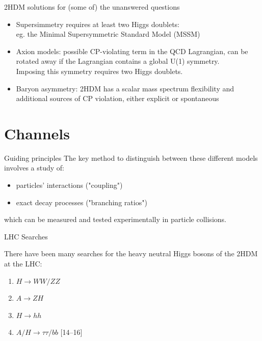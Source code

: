 \documentclass[10pt]{beamer} %
\begin{document}
\begin{frame}{2HDM solutions for (some of) the unanswered questions}
    \begin{itemize}
        \item Supersimmetry requires at least two Higgs doublets:\\
        eg. the Minimal Supersymmetric Standard Model (MSSM)
        \item Axion models: possible CP-violating term in the QCD Lagrangian, can be rotated away if the Lagrangian contains a global U(1) symmetry. \\
        Imposing this symmetry requires two Higgs doublets.
        \item Baryon asymmetry:  2HDM has a scalar mass spectrum flexibility and additional sources of CP violation, either explicit or spontaneous
    \end{itemize}
    
\end{frame}


\section{Channels}

\begin{frame}{Guiding principles}
The key method to distinguish between these different models involves a study of:
\begin{itemize}
    \item particles' interactions ("coupling")
    \item exact decay processes ("branching ratios")
\end{itemize}
which can be measured and tested experimentally in particle collisions.\\
    
\end{frame}


\begin{frame}{LHC Searches}

There have been many searches for the
heavy neutral Higgs bosons of the 2HDM at the LHC:
\begin{enumerate}
    \item $H \to WW/Z Z$
    \item $A \to Z H$ 
    \item $H \to hh$
    \item $A/H \to \tau \tau /bb$
[14–16]
\end{enumerate}
\end{frame}
\end{document}
